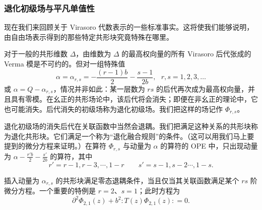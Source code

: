 \subsubsection{退化初级场与平凡单值性}\label{degtriv}


现在我们来回顾关于 Virasoro 代数表示的一些标准事实。这将使我们能够说明，由自由场表示得到的那些特定共形块究竟特殊在哪里。


对于一般的共形维数 $\Delta$，由维数为 $\Delta$ 的最高权向量的所有 Virasoro 后代张成的 Verma 模是不可约的。但对一组特殊值
\begin{equation} \alpha = \alpha_{r,s} = - \frac{(r-1) b}{2} - \frac{s-1}{2 b},~~~r,s=1,2,3,\dots \end{equation}
或 $\alpha = Q- \alpha_{r,s}$，情况并非如此：某一层数为 $r s$ 的后代再次成为最高权向量，并且具有零模。在幺正的共形场论中，该后代将会消失；即便在非幺正的理论中，它也可能消失。后代消失的初级场称为退化初级场。我们把这样的场记作 $\Phi_{r,s}$。


退化初级场的消失后代在关联函数中当然会退耦。我们把满足这种关系的共形块称为退化共形块。它们满足一个称为“退化融合规则”的条件。（这可以用我们马上要提到的微分方程来证明。）在算符 $\Phi_{r,s}$ 与动量为 $\alpha$ 的算符的 OPE 中，只出现动量为 $\alpha - \frac{r' b}{2} - \frac{s'}{2 b}$ 的算符，其中
\begin{equation}
r' = r-1 , r-3, \cdots ,1-r \qquad s' = s-1, s-2 \cdots ,1-s.
\end{equation}

插入动量为 $\alpha_{r,s}$ 的共形块满足零态退耦条件，当且仅当其关联函数满足某个 $rs$ 阶微分方程。一个重要的特例是 $r=2$、$s=1$；此时方程为
\begin{equation}\label{opeq2}
\partial^2 \Phi_{2,1}(z) + b^2 : T(z) \Phi_{2,1}(z): =0.
\end{equation}

